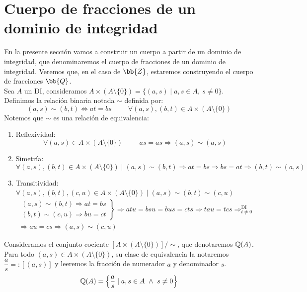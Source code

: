 \section{Cuerpo de fracciones de un dominio de integridad}

En la presente sección vamos a construir un cuerpo a partir de un dominio de integridad, que denominaremos el cuerpo de fracciones de un dominio de integridad. Veremos que, en el caso de $\bb{Z}$, estaremos construyendo el cuerpo de fracciones $\bb{Q}$.\\

Sea $A$ un DI, consideramos $A \times (A \setminus \{0\}) = \{(a,s) \mid a,s \in A,~ s \neq 0\}$.
Definimos la relación binaria notada $\sim$ definida por:
$$(a,s) \sim (b,t) \Longleftrightarrow at = bs\hspace{1cm}\forall (a,s), (b,t) \in A \times (A \setminus \{0\})$$
Notemos que $\sim$ es una relación de equivalencia:
\begin{enumerate}
    \item Reflexividad:
    $$\forall (a,s) \in A \times (A \setminus \{0\})\hspace{1cm}as=as \Longrightarrow (a,s)\sim(a,s)$$

    \item Simetría:
    $$\forall (a,s), (b,t) \in A \times (A \setminus \{0\}) \mid (a,s) \sim (b,t) \Longrightarrow at = bs \Longrightarrow bs = at
    \Longrightarrow (b,t) \sim (a,s)$$

    \item Transitividad: $\forall (a,s), (b,t), (c,u) \in A \times (A \setminus \{0\}) \mid (a,s) \sim (b,t) \sim (c,u)$
    \begin{multline*}
            \left. \begin{array}{l}
            (a,s) \sim (b,t) \Longrightarrow at = bs \\
            (b,t) \sim (c,u) \Longrightarrow bu = ct
        \end{array} \right\} \Longrightarrow atu = bsu = bus = cts \Longrightarrow tau = tcs \mathop{\Longrightarrow}^{\text{DI}}_{t\neq0} \\
        \Longrightarrow au = cs \Longrightarrow (a,s) \sim (c,u)
    \end{multline*}
\end{enumerate}

Consideramos el conjunto cociente $[A \times (A \setminus \{0\})]/\sim$, que denotaremos $\mathbb Q(A)$. Para todo
$(a,s) \in A \times (A \setminus \{0\})$, su clase de equivalencia la notaremos $\dfrac{a}{s} =: [(a,s)]$ y leeremos la fracción de numerador $a$ y denominador $s$.
$$\mathbb Q(A) = \left\{\dfrac{a}{s} \mid a,s \in A \ \land \  s \neq 0 \right\}$$

